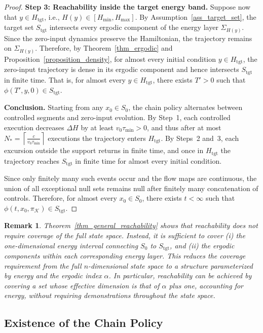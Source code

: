 \documentclass[letterpaper, 10 pt, conference]{ieeeconf}
\newtheorem{remark}{Remark}
\newcommand{\tgt}{\mathrm{tgt}}
\begin{document}
\begin{proof}
\medskip
\noindent\textbf{Step 3: Reachability inside the target energy band.}
Suppose now that $y\in H_{\tgt}$, i.e., $H(y)\in [H_{\min},H_{\max}]$. By Assumption~\ref{ass_target_set}, the target set $S_{\tgt}$ intersects every ergodic component of the energy layer $\Sigma_{H(y)}$. Since the zero-input dynamics preserve the Hamiltonian, the trajectory remains on $\Sigma_{H(y)}$. Therefore, by Theorem~\ref{thm_ergodic} and Proposition~\ref{proposition_density}, for almost every initial condition $y\in H_{\tgt}$, the zero-input trajectory is dense in its ergodic component and hence intersects $S_{\tgt}$ in finite time. That is, for almost every $y\in H_{\tgt}$, there exists $T'>0$ such that $\phi(T',y,0)\in S_{\tgt}.$

\medskip
\noindent\textbf{Conclusion.}
Starting from any $x_0 \in S_0$, the chain policy alternates between controlled segments and zero-input evolution. By Step~1, each controlled execution decreases $\Delta H$ by at least $v_0\tau_{\min}>0$, and thus after at most $N_*=\left\lceil \frac{c}{v_0\tau_{\min}} \right\rceil$ executions the trajectory enters $H_{\tgt}$. By Steps~2 and~3, each excursion outside the support returns in finite time, and once in $H_{\tgt}$ the trajectory reaches $S_{\tgt}$ in finite time for almost every initial condition.

Since only finitely many such events occur and the flow maps are continuous, the union of all exceptional null sets remains null after finitely many concatenation of controls. Therefore, for almost every $x_0 \in S_0$, there exists $t<\infty$ such that $\phi(t,x_0,\pi_{\mathcal K}) \in S_{\tgt}.$
\end{proof}


\begin{remark}
Theorem~\ref{thm_general_reachability} shows that reachability does not require coverage of the full state space. Instead, it is sufficient to cover (i) the one-dimensional energy interval connecting $S_0$ to $S_{\tgt}$, and (ii) the ergodic components within each corresponding energy layer.
This reduces the coverage requirement from the full $n$-dimensional state space to a structure parameterized by energy and the ergodic index $\alpha$. In particular, reachability can be achieved by covering a set whose effective dimension is that of $\alpha$ plus one, accounting for energy, without requiring demonstrations throughout the state space.
\end{remark}

\subsection{Existence of the Chain Policy}
\end{document}
